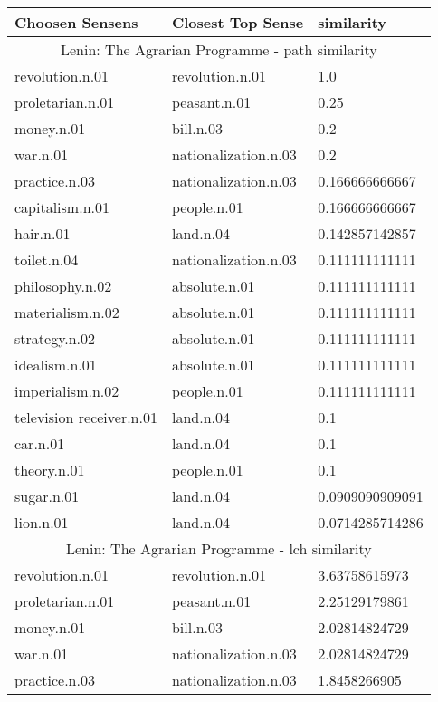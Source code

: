 
    \begin{center}
      \begin{tabular}{ | l | l | l |}
        \hline
        Choosen Sensens & Closest Top Sense & similarity  \\ \hline
\multicolumn{3}{|c|}{Lenin: The Agrarian Programme  - path similarity} \\ \hline
revolution.n.01 & revolution.n.01 & 1.0 \\ \hline
proletarian.n.01 & peasant.n.01 & 0.25 \\ \hline
money.n.01 & bill.n.03 & 0.2 \\ \hline
war.n.01 & nationalization.n.03 & 0.2 \\ \hline
practice.n.03 & nationalization.n.03 & 0.166666666667 \\ \hline
capitalism.n.01 & people.n.01 & 0.166666666667 \\ \hline
hair.n.01 & land.n.04 & 0.142857142857 \\ \hline
toilet.n.04 & nationalization.n.03 & 0.111111111111 \\ \hline
philosophy.n.02 & absolute.n.01 & 0.111111111111 \\ \hline
materialism.n.02 & absolute.n.01 & 0.111111111111 \\ \hline
strategy.n.02 & absolute.n.01 & 0.111111111111 \\ \hline
idealism.n.01 & absolute.n.01 & 0.111111111111 \\ \hline
imperialism.n.02 & people.n.01 & 0.111111111111 \\ \hline
television receiver.n.01 & land.n.04 & 0.1 \\ \hline
car.n.01 & land.n.04 & 0.1 \\ \hline
theory.n.01 & people.n.01 & 0.1 \\ \hline
sugar.n.01 & land.n.04 & 0.0909090909091 \\ \hline
lion.n.01 & land.n.04 & 0.0714285714286 \\ \hline
\multicolumn{3}{|c|}{Lenin: The Agrarian Programme  - lch similarity} \\ \hline
revolution.n.01 & revolution.n.01 & 3.63758615973 \\ \hline
proletarian.n.01 & peasant.n.01 & 2.25129179861 \\ \hline
money.n.01 & bill.n.03 & 2.02814824729 \\ \hline
war.n.01 & nationalization.n.03 & 2.02814824729 \\ \hline
practice.n.03 & nationalization.n.03 & 1.8458266905 \\ \hline

\end{tabular}
\end{center}
